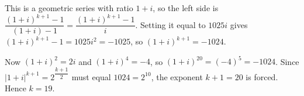 This is a geometric series with ratio $1+i$, so the left side is $\dfrac{(1+i)^{k+1}-1}{(1+i)-1}=\dfrac{(1+i)^{k+1}-1}{i}$. Setting it equal to $1025i$ gives $(1+i)^{k+1}-1=1025i^2=-1025$, so $(1+i)^{k+1}=-1024$.

Now $(1+i)^2=2i$ and $(1+i)^4=-4$, so $(1+i)^{20}=(-4)^5=-1024$. Since $|1+i|^{k+1}=2^{\dfrac{k+1}{2}}$ must equal $1024=2^{10}$, the exponent $k+1=20$ is forced. Hence $k=\boxed{19}$.
